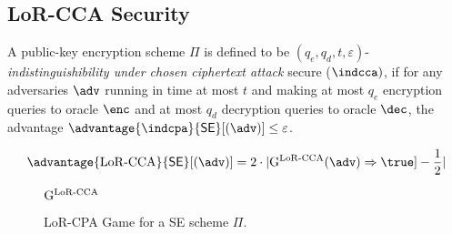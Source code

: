 \subsection{LoR-CCA Security}
A public-key encryption scheme  $\Pi$ is defined to be $(q_e, q_d, t,\varepsilon)$-\textit{indistinguishibility under chosen ciphertext attack} secure ($\indcca)$, if for any adversaries $\adv$ running in time at most $t$ and making at most $q_e$ encryption queries to oracle $\enc$ and at most $q_d$ decryption queries to oracle $\dec$, the advantage $\advantage{\indcpa}{\textsf{SE}}[(\adv)] \leq \varepsilon$.

$$
\advantage{\lorcca}{\textsf{SE}}[(\adv)] = 2 \cdot | \mathrm{G}^{\lorcca}(\adv) \Rightarrow \true ] - \frac{1}{2} | 
$$ 


\begin{figure}[!h]
\centering
\begin{codeframe}[colback = white, width=9.75cm, height=6.5cm]{$\mathrm{G}^{\mathrm{LoR\textrm-CCA}}$}
\begin{pchstack}[space=0.5cm]
\begin{pcvstack}[space=0.3cm]

\end{pcvstack}

\begin{pcvstack}[space=0.3cm]
\end{pcvstack}

\end{pchstack}
\end{codeframe}
\caption{LoR-CPA Game for a \textsf{SE} scheme $\Pi$. }
\label{fig:lorcca-game-pkc}
\end{figure}



